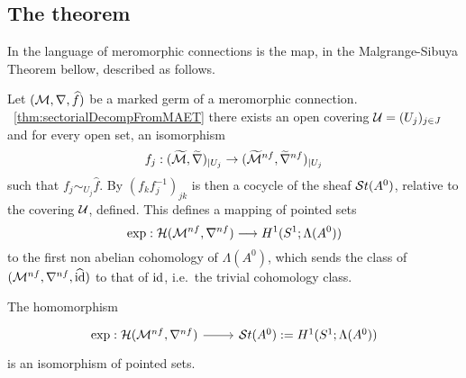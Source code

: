 \subsection{The theorem}

In the language of meromorphic connections is the map, in the Malgrange-Sibuya
Theorem bellow, described as follows.

Let $(\mathcal{M},\nabla,\widehat f)$ be a marked germ of a  meromorphic connection.
~\ref{thm:sectorialDecompFromMAET} there exists an open
covering $\mathcal{U}=(U_j)_{j\in J}$ and for every open set, an isomorphism
\[
  f_j:(\widetilde{\mathcal{M}},\widetilde\nabla)_{|U_j}
  \to(\widetilde{\mathcal{M}}^{nf},\widetilde\nabla^{nf})_{|U_j}
\]
such that $f_j\sim_{U_j}\hat f$.
By $(f_kf_j^{-1})_{jk}$ is then a cocycle of the sheaf $\mathcal{S}{}t(A^0)$, relative
to the covering $\mathcal{U}$, defined.
This defines a mapping of pointed sets
\[
  \exp:\mathcal{H}(\mathcal{M}^{nf},\nabla^{nf})\longrightarrow H^1(S^1;\Lambda(A^0))
\]
to the first non abelian cohomology of $\Lambda(A^0)$, which sends the class of
$(\mathcal{M}^{nf},\nabla^{nf},\widehat{\operatorname{id}})$ to that of $\operatorname{id}$, i.e.\ the trivial cohomology
class.

\begin{center}
  \begin{minipage}[t]{0.8\textwidth}
    \begin{tthm} \label{thm:mainThm1MeromVersion}
      The homomorphism
      \[ \begin{tikzcd}
          \exp:\cH(\cM^{nf},\nabla^{nf}) \rar& \St(A^0):=H^1(S^1;\Lambda(A^0))
      \end{tikzcd} \]
      is an isomorphism of pointed sets.
    \end{tthm}
  \end{minipage}
\end{center}

